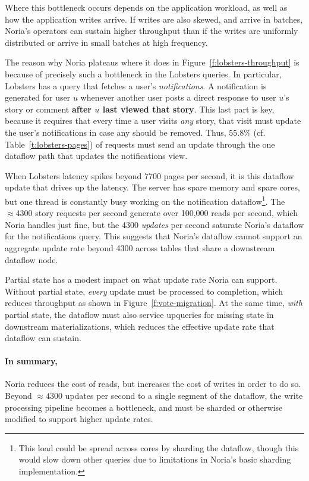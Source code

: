 Where this bottleneck occurs depends on the application workload, as well as how
the application writes arrive. If writes are also skewed, and arrive in batches,
Noria's operators can sustain higher throughput than if the writes are uniformly
distributed or arrive in small batches at high frequency.

The reason why Noria plateaus where it does in
Figure~\vref{f:lobsters-throughput} is because of precisely such a bottleneck in
the Lobsters queries. In particular, Lobsters has a query that fetches a user's
\emph{notifications}. A notification is generated for user $u$ whenever another
user posts a direct response to user $u$'s story or comment \textbf{after $u$
last viewed that story}. This last part is key, because it requires that every
time a user visits \emph{any} story, that visit must update the user's
notifications in case any should be removed. Thus, 55.8\% (cf.
Table~\vref{t:lobsters-pages}) of requests must send an update through the one
dataflow path that updates the notifications view.

When Lobsters latency spikes beyond 7700 pages per second, it is this dataflow
update that drives up the latency. The server has spare memory and spare cores,
but one thread is constantly busy working on the notification
dataflow\footnote{This load could be spread across cores by sharding the
dataflow, though this would slow down other queries due to limitations in
Noria's basic sharding implementation.}. The $\approx4300$ story requests per
second generate over 100,000 reads per second, which Noria handles just fine,
but the 4300 \emph{updates} per second saturate Noria's dataflow for the
notifications query. This suggests that Noria's dataflow cannot support an
aggregate update rate beyond 4300 across tables that share a downstream dataflow
node.

Partial state has a modest impact on what update rate Noria can support. Without
partial state, \emph{every} update must be processed to completion, which
reduces throughput as shown in Figure~\vref{f:vote-migration}. At the same time,
\emph{with} partial state, the dataflow must also service upqueries for missing
state in downstream materializations, which reduces the effective update rate
that dataflow can sustain.

\paragraph{In summary,} Noria reduces the cost of reads, but increases the cost
of writes in order to do so. Beyond $\approx4300$ updates per second to a single
segment of the dataflow, the write processing pipeline becomes a bottleneck, and
must be sharded or otherwise modified to support higher update rates.
